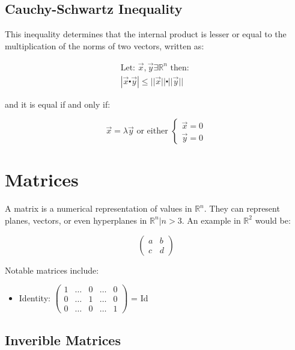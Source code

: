 \documentclass[11pt,fleqn]{book} %
\begin{document}
\subsection{Cauchy-Schwartz Inequality}

This inequality determines that the internal product is lesser or equal to the
multiplication of the norms of two vectors, written as:

\begin{gather}
    \text{Let: } \vec{x},\vec{y} \exists \mathbb{R}^n \text{ then: }\\
    |\vec{x}\centerdot\vec{y}| \le ||\vec{x}|| \centerdot ||\vec{y}||
\end{gather}

and it is equal if and only if:

\begin{equation}
    \vec{x} = \lambda \vec{y} \text{ or either } \begin{cases}
        \vec{x} = 0 \\
        \vec{y} = 0
    \end{cases}
\end{equation}

\section{Matrices}

A matrix is a numerical representation of values in $ \mathbb{R}^n $. They can represent 
planes, vectors, or even hyperplanes in $ \mathbb{R}^n | n > 3 $. An example in $\mathbb{R}^2$
would be:

\begin{equation}
    \begin{pmatrix}
        a & b \\
        c & d
    \end{pmatrix}
\end{equation}

Notable matrices include:
\begin{itemize}
    \item Identity: $ \begin{pmatrix}
        1 & \dots & 0 & \dots & 0 \\
        0 & \dots & 1 & \dots & 0 \\
        0 & \dots & 0 & \dots & 1
    \end{pmatrix} $ = Id
\end{itemize}

\subsection{Inverible Matrices}
\end{document}
